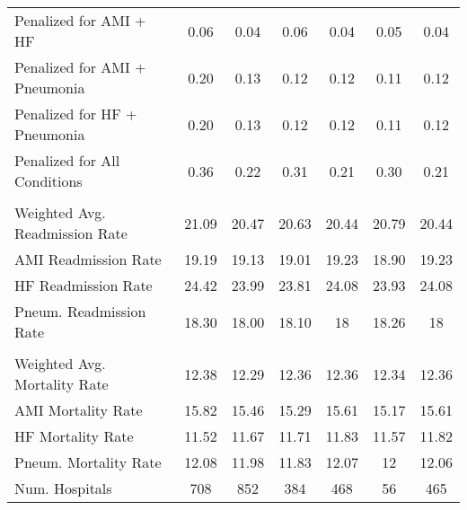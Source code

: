\begin{table}[ht!]
\begin{tabular}[t]{lcccccc}
\hspace{1em}Penalized for AMI + HF & 0.06 & 0.04 & 0.06 & 0.04 & 0.05 & 0.04\\
\hspace{1em}Penalized for AMI + Pneumonia & 0.20 & 0.13 & 0.12 & 0.12 & 0.11 & 0.12\\
\hspace{1em}Penalized for HF + Pneumonia & 0.20 & 0.13 & 0.12 & 0.12 & 0.11 & 0.12\\
\hspace{1em}Penalized for All Conditions & 0.36 & 0.22 & 0.31 & 0.21 & 0.30 & 0.21\\
\addlinespace[0.3em]
\multicolumn{7}{l}{\textbf{Readmission Outcome Variables}}\\
\hspace{1em}Weighted Avg. Readmission Rate & 21.09 & 20.47 & 20.63 & 20.44 & 20.79 & 20.44\\
\hspace{1em}AMI Readmission Rate & 19.19 & 19.13 & 19.01 & 19.23 & 18.90 & 19.23\\
\hspace{1em}HF Readmission Rate & 24.42 & 23.99 & 23.81 & 24.08 & 23.93 & 24.08\\
\hspace{1em}Pneum. Readmission Rate & 18.30 & 18.00 & 18.10 & 18 & 18.26 & 18\\
\addlinespace[0.3em]
\multicolumn{7}{l}{\textbf{Mortality Outcome Variables}}\\
\hspace{1em}Weighted Avg. Mortality Rate & 12.38 & 12.29 & 12.36 & 12.36 & 12.34 & 12.36\\
\hspace{1em}AMI Mortality Rate & 15.82 & 15.46 & 15.29 & 15.61 & 15.17 & 15.61\\
\hspace{1em}HF Mortality Rate & 11.52 & 11.67 & 11.71 & 11.83 & 11.57 & 11.82\\
\hspace{1em}Pneum. Mortality Rate & 12.08 & 11.98 & 11.83 & 12.07 & 12 & 12.06\\
\addlinespace[0.3em]
Num. Hospitals & 708 & 852 & 384 & 468 & 56 & 465\\
\bottomrule
\end{tabular}
\end{table}
